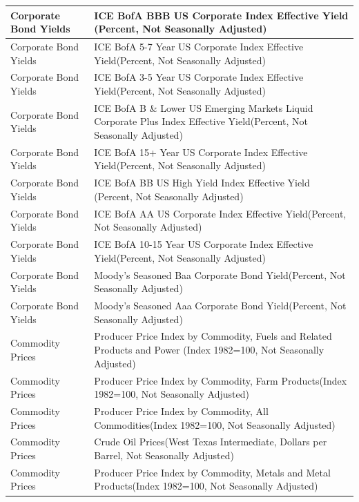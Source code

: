 \begin{center}
\begin{singlespace}
\begin{scriptsize}
\begin{longtable}{p{}|p{}}
        \hline
        Corporate Bond Yields  & ICE BofA BBB US Corporate Index Effective Yield (Percent, Not Seasonally Adjusted) \\
        \hline
        Corporate Bond Yields  & ICE BofA 5-7 Year US Corporate Index Effective Yield(Percent, Not Seasonally Adjusted) \\
        \hline
        Corporate Bond Yields  & ICE BofA 3-5 Year US Corporate Index Effective Yield(Percent, Not Seasonally Adjusted) \\
        \hline
        Corporate Bond Yields  & ICE BofA B \& Lower US Emerging Markets Liquid Corporate Plus Index Effective Yield(Percent, Not Seasonally Adjusted) \\
        \hline
        Corporate Bond Yields  & ICE BofA 15+ Year US Corporate Index Effective Yield(Percent, Not Seasonally Adjusted) \\
        \hline
        Corporate Bond Yields  & ICE BofA BB US High Yield Index Effective Yield (Percent, Not Seasonally Adjusted) \\
        \hline
        Corporate Bond Yields  & ICE BofA AA US Corporate Index Effective Yield(Percent, Not Seasonally Adjusted) \\
        \hline
        Corporate Bond Yields  & ICE BofA 10-15 Year US Corporate Index Effective Yield(Percent, Not Seasonally Adjusted) \\
        \hline
        Corporate Bond Yields  & Moody's Seasoned Baa Corporate Bond Yield(Percent, Not Seasonally Adjusted) \\
        \hline
        Corporate Bond Yields  & Moody's Seasoned Aaa Corporate Bond Yield(Percent, Not Seasonally Adjusted) \\
        \hline
        Commodity Prices  & Producer Price Index by Commodity, Fuels and Related Products and Power (Index 1982=100, Not Seasonally Adjusted) \\
        \hline
        Commodity Prices  & Producer Price Index by Commodity, Farm Products(Index 1982=100, Not Seasonally Adjusted) \\
        \hline
        Commodity Prices  & Producer Price Index by Commodity, All Commodities(Index 1982=100, Not Seasonally Adjusted) \\
        \hline
        Commodity Prices  & Crude Oil Prices(West Texas Intermediate, Dollars per Barrel, Not Seasonally Adjusted) \\
        \hline
        Commodity Prices  & Producer Price Index by Commodity, Metals and Metal Products(Index 1982=100, Not Seasonally Adjusted) \\

\end{longtable}
\end{scriptsize}
\end{singlespace}
\end{center}
